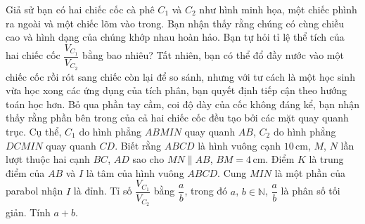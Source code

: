 \begin{ex}%
Giả sử bạn có hai chiếc cốc cà phê $C_1$ và $C_2$ như hình minh họa, một chiếc phình ra ngoài và một chiếc lõm vào trong. Bạn nhận thấy rằng chúng có cùng chiều cao và hình dạng của chúng khớp nhau hoàn hảo. Bạn tự hỏi tỉ lệ thể tích của hai chiếc cốc $\dfrac{V_{C_1}}{V_{C_2}}$ bằng bao nhiêu? Tất nhiên, bạn có thể đổ đầy nước vào một chiếc cốc rồi rót sang chiếc còn lại để so sánh, nhưng với tư cách là một học sinh vừa học xong các ứng dụng của tích phân, bạn quyết định tiếp cận theo hướng toán học hơn. Bỏ qua phần tay cầm, coi độ dày của cốc không đáng kể, bạn nhận thấy rằng phần bên trong của cả hai chiếc cốc đều tạo bởi các mặt quay quanh trục. Cụ thể, $C_1$ do hình phẳng $ABMIN$ quay quanh $AB$, $C_2$ do hình phẳng $DCMIN$ quay quanh $CD$. Biết rằng $ABCD$ là hình vuông cạnh $10$\,cm, $M$, $N$ lần lượt thuộc hai cạnh $BC$, $AD$ sao cho $MN\parallel AB$, $BM=4$\,cm. Điểm $K$ là trung điểm của $AB$ và $I$ là tâm của hình vuông $ABCD$. Cung $MIN$ là một phần của parabol nhận $I$ là đỉnh. Tỉ số $\dfrac{V_{C_1}}{V_{C_2}}$ bằng $\dfrac{a}{b}$, trong đó $a$, $b \in \mathbb{N}$, $\dfrac{a}{b}$ là phân số tối giản. Tính $a+b$.
\begin{center}
\end{center}
\loigiai{

}
\end{ex}
